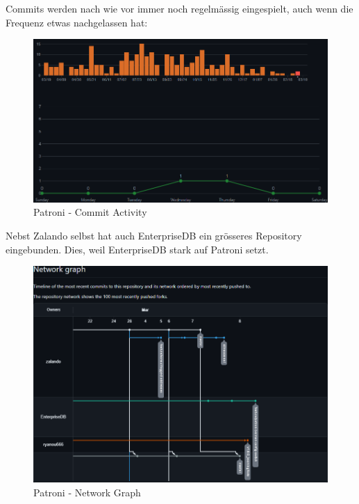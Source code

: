 \begin{flushleft}
    Commits werden nach wie vor immer noch regelmässig eingespielt, auch wenn die Frequenz etwas nachgelassen hat:
    \begin{figure}[H]
        \centering
        \includegraphics[width=0.75\linewidth]{source/implementation/evaluation/postgresql_ha_solutions/insights/patroni/commit_activity_zalando_patroni}
        \caption{Patroni - Commit Activity}
        \label{fig:commit_activity_zalando_patroni}
    \end{figure}

    Nebst Zalando selbst hat auch EnterpriseDB\cite{RUE8EPJ4} ein grösseres Repository eingebunden.
    Dies, weil EnterpriseDB stark auf Patroni setzt.
     \begin{figure}[H]
        \centering
        \includegraphics[width=0.75\linewidth]{source/implementation/evaluation/postgresql_ha_solutions/insights/patroni/networkgraph_zalando_patroni}
        \caption{Patroni - Network Graph}
        \label{fig:networkgraph_zalando_patroni}
    \end{figure}
\end{flushleft}